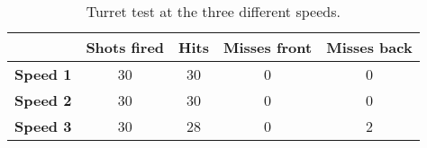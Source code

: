 \begin{table}[H]
\centering
\setlength\extrarowheight{3pt}
\begin{tabulary}{\textwidth}{|C|C|C|C|C|}
\hline
 & \textbf{Shots fired} & \textbf{Hits} & \textbf{Misses front} & \textbf{Misses back} \\
\hline
\textbf{Speed 1} & 30 & 30 & 0 & 0\\
\hline
\textbf{Speed 2} & 30 & 30 & 0 & 0\\
\hline
\textbf{Speed 3} & 30 & 28 & 0 & 2 \\
\hline
\end{tabulary}
\caption{Turret test at the three different speeds.}
\label{tab:speed1}
\end{table}
\FloatBarrier